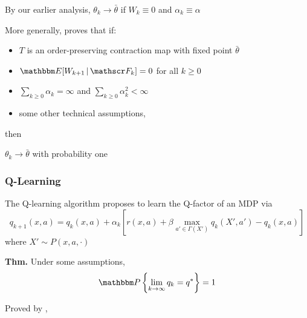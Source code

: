 \documentclass[xcolor=dvipsnames]{beamer}  %
\renewcommand{\geq}{\geqslant}
\newcommand{\1}{\mathbbm 1}
\newcommand{\given}{\, | \,}
\newcommand{\PP}{\mathbbm P}
\newcommand{\EE}{\mathbbm E}
\newcommand{\fF}{\mathscr F}
\begin{document}
\begin{frame}
    
    By our earlier analysis, $\theta_k \to \bar \theta$ if $W_k \equiv 0$ and
    $\alpha_k \equiv \alpha$

    \vspace{0.5em}
    More generally, \cite{tsitsiklis1994asynchronous} proves that if:
    \begin{itemize}
        \item $T$ is an order-preserving contraction map with fixed
            point $\bar \theta$
            \vspace{0.5em}
        \item $\EE [W_{k+1} \given \fF_k] = 0$ for all $k \geq 0$
            \vspace{0.5em}
        \item $\sum_{k \geq 0} \alpha_k = \infty$ and $\sum_{k \geq 0} \alpha_k^2 < \infty$
            \vspace{0.5em}
        \item some other technical assumptions,
    \end{itemize}
    then 
    \begin{center}
        $\theta_k \to \bar \theta$ with probability one
    \end{center}

\end{frame}


\begin{frame}
    \frametitle{Q-Learning}

    The Q-learning algorithm \cite{watkins1989learning} proposes to learn the Q-factor of an MDP
    via
    \begin{equation*}
        q_{k+1}(x,a) 
        = q_k(x,a) + \alpha_k 
        \left[
            r(x,a) + \beta \max_{a' \in \Gamma(X')} q_k(X', a')
            - q_k(x,a)
        \right]
    \end{equation*}
    where $X' \sim P(x, a, \cdot)$

            \vspace{0.5em}
            \vspace{0.5em}
    {\bf Thm.} Under some assumptions, 
    \begin{equation*}
        \PP
        \left\{
            \lim_{k \to \infty}
            q_k = q^*
        \right\} = 1
    \end{equation*}

    Proved by \cite{tsitsiklis1994asynchronous}, \cite{watkins1992q}

\end{frame}
\end{document}
